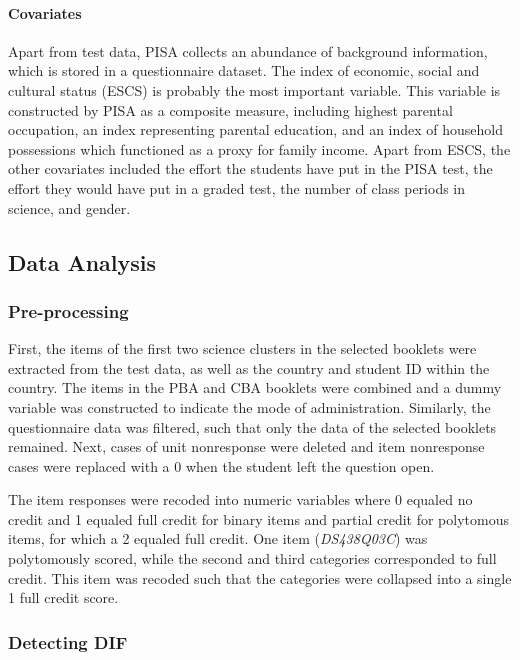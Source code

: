 \documentclass{article}
\begin{document}
\paragraph{Covariates} \label{sec:cov} Apart from test data, PISA collects an abundance of background information, which is stored in a questionnaire dataset. The index of economic, social and cultural status (ESCS) is probably the most important variable. This variable is constructed by PISA as a composite measure, including highest parental occupation, an index representing parental education, and an index of household possessions which functioned as a proxy for family income. Apart from ESCS, the other covariates included the effort the students have put in the PISA test, the effort they would have put in a graded test, the number of class periods in science, and gender.

\subsection{Data Analysis}

\subsubsection{Pre-processing} \label{sec:pre-processing}
First, the items of the first two science clusters in the selected booklets were extracted from the test data, as well as the country and student ID within the country. The items in the PBA and CBA booklets were combined and a dummy variable was constructed to indicate the mode of administration. Similarly, the questionnaire data was filtered, such that only the data of the selected booklets remained. Next, cases of unit nonresponse were deleted and item nonresponse cases were replaced with a 0 when the student left the question open.

The item responses were recoded into numeric variables where 0 equaled no credit and 1 equaled full credit for binary items and partial credit for polytomous items, for which a 2 equaled full credit. One item (\textit{DS438Q03C}) was polytomously scored, while the second and third categories corresponded to full credit. This item was recoded such that the categories were collapsed into a single 1 full credit score. 

\subsubsection{Detecting DIF}
\end{document}
